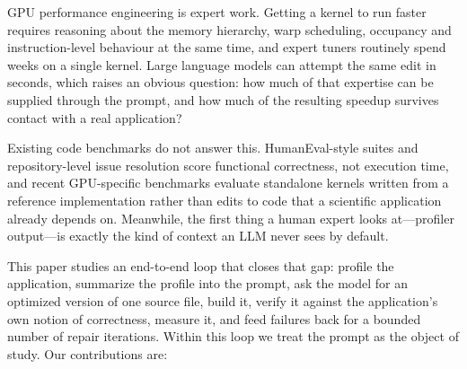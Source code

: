 GPU performance engineering is expert work. Getting a kernel to run faster requires reasoning about the
memory hierarchy, warp scheduling, occupancy and instruction-level behaviour at the same time, and
expert tuners routinely spend weeks on a single kernel. Large language models can attempt the same edit
in seconds, which raises an obvious question: how much of that expertise can be supplied through the
prompt, and how much of the resulting speedup survives contact with a real application?

Existing code benchmarks do not answer this. HumanEval-style suites \cite{chen2021codex} and
repository-level issue resolution \cite{jimenez2024swebench} score functional correctness, not
execution time, and recent GPU-specific benchmarks \cite{ouyang2025kernelbench,nichols2024parallel}
evaluate standalone kernels written from a reference implementation rather than edits to code that a
scientific application already depends on. Meanwhile, the first thing a human expert looks at---profiler
output---is exactly the kind of context an LLM never sees by default.

This paper studies an end-to-end loop that closes that gap: profile the application, summarize the
profile into the prompt, ask the model for an optimized version of one source file, build it, verify it
against the application's own notion of correctness, measure it, and feed failures back for a bounded
number of repair iterations. Within this loop we treat the prompt as the object of study. Our
contributions are:

